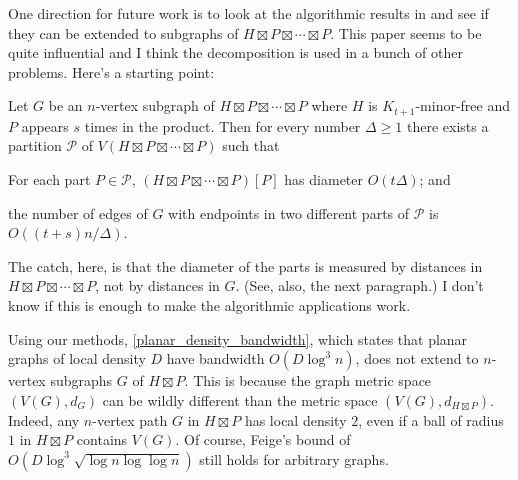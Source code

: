 \documentclass{patmorin}
\renewcommand{\ge}{\geqslant}
\begin{document}
\begin{tcolorbox}[width=\textwidth,colback={orange}]
  One direction for future work is to look at the algorithmic results in \citet{klein.plotkin.ea:excluded} and see if they can be extended to subgraphs of $H\boxtimes P\boxtimes\cdots\boxtimes P$.  This paper seems to be quite influential and I think the decomposition is used in a bunch of other problems.  Here's a starting point:

  \begin{thm}
    Let $G$ be an $n$-vertex subgraph of $H\boxtimes P\boxtimes\cdots\boxtimes P$ where $H$ is $K_{t+1}$-minor-free and $P$ appears $s$ times in the product.  Then for every number $\Delta\ge 1$ there exists a partition $\mathcal{P}$ of $V(H\boxtimes P\boxtimes \cdots\boxtimes P)$ such that
    \begin{compactenum}[(i)]
      \item For each part $P\in\mathcal{P}$, $(H\boxtimes P\boxtimes \cdots\boxtimes P)[P]$ has diameter $O(t\Delta)$; and
      \item the number of edges of $G$ with endpoints in two different parts of $\mathcal{P}$ is $O((t+s)n/\Delta)$.
    \end{compactenum}
  \end{thm}
  The catch, here, is that the diameter of the parts is measured by distances in $H\boxtimes P\boxtimes\cdots\boxtimes P$, not by distances in $G$.  (See, also, the next paragraph.)  I don't know if this is enough to make the algorithmic applications work.
\end{tcolorbox}

Using our methods, \cref{planar_density_bandwidth}, which states that planar graphs of local density $D$ have bandwidth $O(D\log^3 n)$, does not extend to $n$-vertex subgraphs $G$ of  $H\boxtimes P$. This is because the graph metric space $(V(G),d_G)$ can be wildly different than the metric space $(V(G),d_{H\boxtimes P})$. Indeed, any $n$-vertex path $G$ in $H\boxtimes P$ has local density $2$, even if a ball of radius $1$ in $H\boxtimes P$ contains $V(G)$.  Of course, Feige's bound of $O(D\log^3\sqrt{\log n\log\log n})$ still holds for arbitrary graphs.

\end{document}
